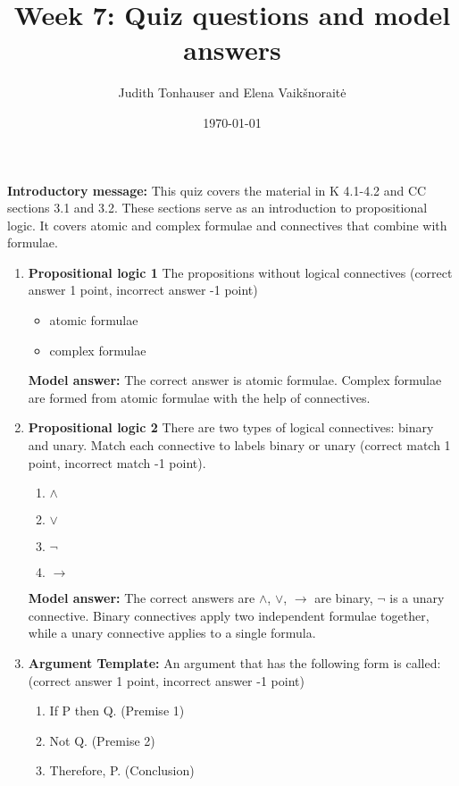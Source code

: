 \documentclass[a4,11pt]{article}
\title{Week 7: Quiz questions and model answers}
\author{Judith Tonhauser and Elena Vaik\v snorait\.{e} }
\date{\today}
\begin{document}
\maketitle

{\bf Introductory message:} This quiz covers the material in K 4.1-4.2 and CC sections 3.1 and 3.2. These sections serve as an introduction to propositional logic. It covers atomic and complex formulae and connectives that combine with formulae.

\begin{enumerate}[leftmargin = 12pt]

\item {\bf Propositional logic 1}
The propositions without logical connectives (correct answer 1 point, incorrect answer -1 point)

\begin{itemize}[noitemsep]
\item atomic formulae
\item complex formulae
\end{itemize}

{\bf Model answer:} The correct answer is atomic formulae. Complex formulae are formed from atomic formulae with the help of connectives.


\item {\bf Propositional logic 2}
There are two types of logical connectives: binary and unary. Match each connective to labels binary or unary (correct match 1 point, incorrect match -1 point).

\begin{enumerate}[noitemsep]
\item $\land$
\item $\lor$
\item $\neg$
\item $\rightarrow$
\end{enumerate}

{\bf Model answer:} The correct answers are $\land$, $\lor$, $\rightarrow$ are binary, $\neg$ is a unary connective. Binary connectives apply two independent formulae together, while a unary connective applies to a single formula.


\item {\bf Argument Template:} An argument that has the following form is called: (correct answer 1 point, incorrect answer -1 point)

\begin{enumerate}[noitemsep]
\item[] If P then Q.  \hfill (Premise 1)
\item[] Not Q.  \hfill  (Premise 2)
\item[] Therefore, P. \hfill  (Conclusion)
\end{enumerate}


\end{enumerate}
\end{document}
